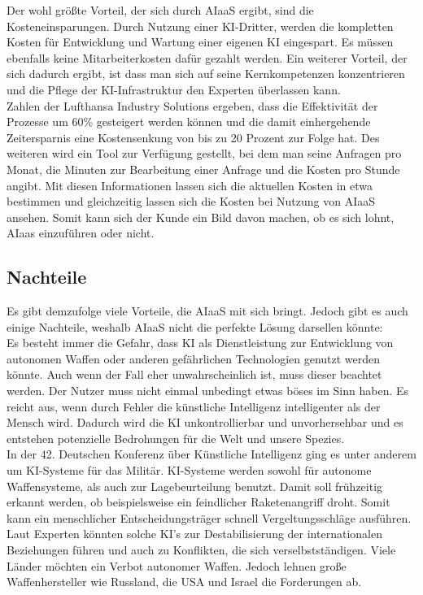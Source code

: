 Der wohl größte Vorteil, der sich durch AIaaS ergibt, sind die Kosteneinsparungen. Durch Nutzung einer KI-Dritter, werden die kompletten Kosten für Entwicklung und Wartung einer eigenen KI eingespart. Es müssen ebenfalls keine Mitarbeiterkosten dafür gezahlt werden. Ein weiterer Vorteil, der sich dadurch ergibt, ist dass man sich auf seine Kernkompetenzen konzentrieren und die Pflege der KI-Infrastruktur den Experten überlassen kann.\\
Zahlen der Lufthansa Industry Solutions ergeben, dass die Effektivität der Prozesse um 60\% gesteigert werden können und die damit einhergehende Zeitersparnis eine Kostensenkung von bis zu 20 Prozent zur Folge hat. Des weiteren wird ein Tool zur Verfügung gestellt, bei dem man seine Anfragen pro Monat, die Minuten zur Bearbeitung einer Anfrage und die Kosten pro Stunde angibt. Mit diesen Informationen lassen sich die aktuellen Kosten in etwa bestimmen und gleichzeitig lassen sich die Kosten bei Nutzung von AIaaS ansehen.
Somit kann sich der Kunde ein Bild davon machen, ob es sich lohnt, AIaas einzuführen oder nicht. \cite[vgl.][]{LIS.2022} \\ 

\subsection{Nachteile}
Es gibt demzufolge viele Vorteile, die AIaaS mit sich bringt. Jedoch gibt es auch einige Nachteile, weshalb AIaaS nicht die perfekte Lösung darsellen könnte:\\
Es besteht immer die Gefahr, dass KI als Dienstleistung zur Entwicklung von autonomen Waffen oder anderen gefährlichen Technologien genutzt werden könnte. Auch wenn der Fall eher unwahrscheinlich ist, muss dieser beachtet werden. Der Nutzer muss nicht einmal unbedingt etwas böses im Sinn haben. Es reicht aus, wenn durch Fehler die künstliche Intelligenz intelligenter als der Mensch wird. Dadurch wird die KI unkontrollierbar und unvorhersehbar und es entstehen potenzielle Bedrohungen für die Welt und unsere Spezies. \\
In der 42. Deutschen Konferenz über Künstliche Intelligenz ging es unter anderem um KI-Systeme für das Militär. KI-Systeme werden sowohl für autonome Waffensysteme, als auch zur Lagebeurteilung benutzt. Damit soll frühzeitig erkannt werden, ob beispielsweise ein feindlicher Raketenangriff droht. Somit kann ein menschlicher Entscheidungsträger schnell Vergeltungsschläge ausführen. Laut Experten könnten solche KI's zur Destabilisierung der internationalen Beziehungen führen und auch zu Konflikten, die sich verselbstständigen. Viele Länder möchten ein Verbot autonomer Waffen. Jedoch lehnen große Waffenhersteller wie Russland, die USA und Israel die Forderungen ab. \cite[vgl.][]{Deutschlandfunk.2019}

